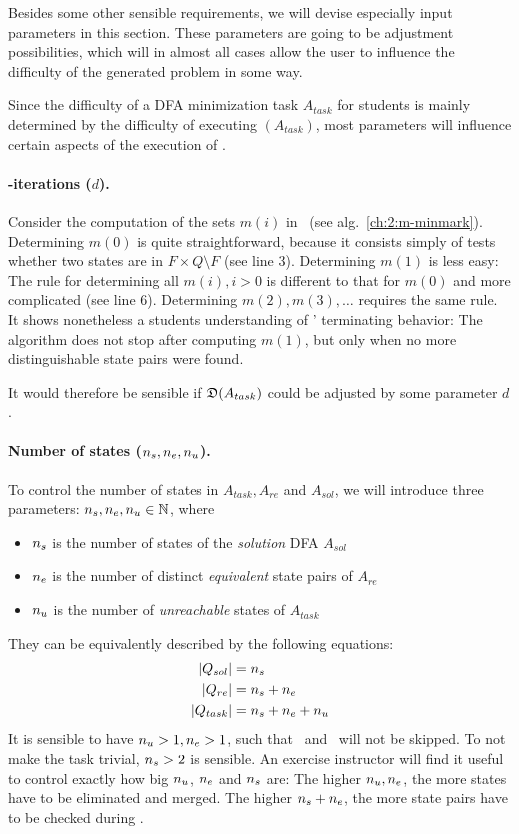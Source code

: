 
Besides some other sensible requirements, we will devise especially input parameters in this section. These parameters are going to be adjustment possibilities, which will in almost all cases allow the user to influence the difficulty of the generated problem in some way.

Since the difficulty of a DFA minimization task $A_{task}$ for students is mainly determined by the difficulty of executing \MinAlg$(A_{task})$, most parameters will influence certain aspects of the execution of \MinAlg.

\paragraph*{\CompDist-iterations ($d$).}

Consider the computation of the sets $m(i)$ in \mCompDist\ (see alg.~\ref{ch:2:m-minmark}). Determining $m(0)$ is quite straightforward, because it consists simply of tests whether two states are in $F \times Q \setminus F$ (see line 3). Determining $m(1)$ is less easy: The rule for determining all $m(i), i > 0$ is different to that for $m(0)$ and more complicated (see line 6). Determining $m(2), m(3), \ldots$ requires the same rule. It shows nonetheless a students understanding of \CompDist' terminating behavior: The algorithm does not stop after computing $m(1)$, but only when no more distinguishable state pairs were found.

It would therefore be sensible if $\mathfrak{D}(A_{task})$ could be adjusted by some parameter $d$.

\paragraph*{Number of states \texorpdfstring{(${n_s}, {n_e}, {n_u}$)}{}.}

To control the number of states in $A_{task}, A_{re}$ and $A_{sol}$, we will introduce three parameters: ${n_s}, {n_e}, {n_u} \in \mathbb{N}$, where
\begin{itemize}
	\item ${n_s}$ is the number of states of the \emph{solution} DFA $A_{sol}$
	\item ${n_e}$ is the number of distinct \emph{equivalent} state pairs of $A_{re}$
	\item ${n_u}$ is the number of \emph{unreachable} states of $A_{task}$
\end{itemize}
They can be equivalently described by the following equations:
\begin{align*}
    |Q_{sol}| &= {n_s} \\
    |Q_{re}| &= {n_s} + {n_e} \\
    |Q_{task}| &= {n_s} + {n_e} + {n_u}
\end{align*}
It is sensible to have ${n_u} > 1, {n_e} > 1$, such that \RemUnr\ and \RemEq\ will not be skipped. To not make the task trivial, ${n_s} > 2$ is sensible. An exercise instructor will find it useful to control exactly how big ${n_u}$, ${n_e}$ and ${n_s}$ are: The higher ${n_u}, {n_e}$, the more states have to be eliminated and merged. The higher ${n_s} + {n_e}$, the more state pairs have to be checked during \CompDist.

